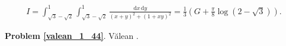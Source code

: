 %

\begin{problem_with_solution}
    \label{valean_1_44}%
    \begin{align}
        I = \int_{\sqrt{3} - \sqrt{2}}^1 \int_{\sqrt{3} - \sqrt{2}}^1 \frac{\mathrm{d}x \,\mathrm{d}y}{(x+y)^2 + (1+xy)^2} = \frac 1 3 \left(G + \frac \pi 8 \log (2 - \sqrt3)\right).
    \end{align} 
\end{problem_with_solution}


\textbf{Problem \ref{valean_1_44}}.
Vălean \cite[s. 29]{nahin15}.


%